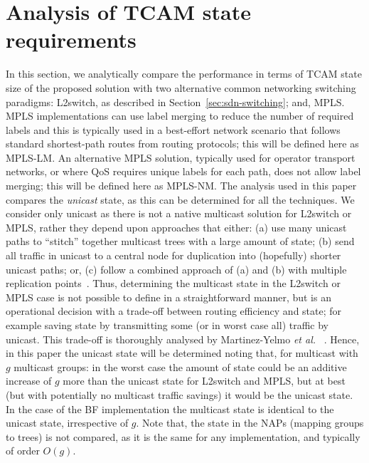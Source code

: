 \documentclass[conference]{IEEEtran}
\begin{document}
\section{Analysis of TCAM state requirements}
\label{sec:algo}

In this section, we analytically compare the performance in terms of  TCAM state size of the proposed solution with two alternative common networking switching paradigms: L2switch, as described in Section~\ref{sec:sdn-switching}; and, MPLS. MPLS implementations can use label merging to reduce the number of required labels and this is typically used in a best-effort network scenario that follows standard shortest-path routes from routing protocols; this will be defined here as MPLS-LM. An alternative MPLS solution, typically used for operator transport networks, or where QoS requires unique labels for each path, does not allow label merging; this will be defined here as MPLS-NM. The analysis used in this paper compares the \emph{unicast} state, as this can be determined for all the techniques. We consider only unicast as there is not a native multicast solution for L2switch or MPLS, rather they depend upon approaches that either: (a) use many unicast paths to ``stitch'' together multicast trees with a large amount of state; (b) send all traffic in unicast to a central node for duplication into (hopefully) shorter unicast paths; or, (c) follow a combined approach of (a) and (b) with multiple replication points~\cite{Rosen12}. Thus, determining the multicast state in the L2switch or MPLS case is not possible to define in a straightforward manner, but is an operational decision with a trade-off between routing efficiency and state; for example saving state by transmitting some (or in worst case all) traffic by unicast. This trade-off is thoroughly analysed by Martinez-Yelmo \emph{et al.} ~\cite{Martinez-Yelmo2007}. Hence, in this paper the unicast state will be determined noting that, for multicast with $g$ multicast groups: in the worst case the amount of state could be an additive increase of $g$ more than the unicast state for L2switch and MPLS, but at best (but with potentially no multicast traffic savings) it would be the unicast state. In the case of the BF implementation the multicast state is identical to the unicast state, irrespective of $g$. Note that, the state in the NAPs (mapping groups to trees) is not compared, as it is the same for any implementation, and typically of order $O(g)$.
\end{document}
